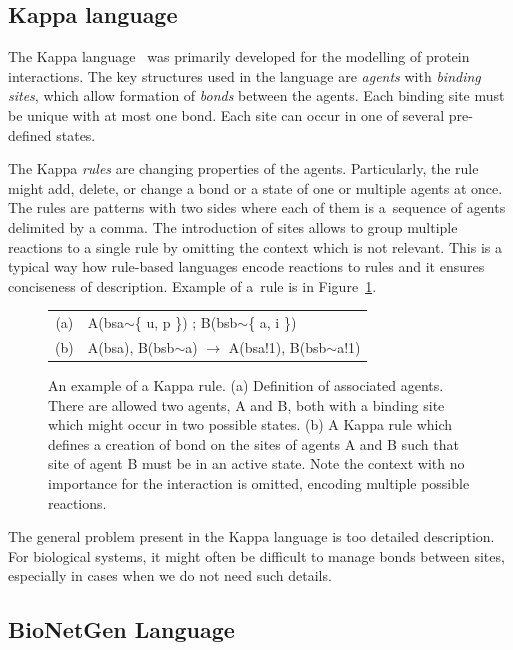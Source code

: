 \documentclass[11pt,a4paper]{report}
\begin{document}
\subsection{Kappa language}
\label{kappa}

The Kappa language~\cite{kappa_formal} was primarily developed for the modelling of protein interactions. The key structures used in the language are \emph{agents} with \emph{binding sites}, which allow formation of \emph{bonds} between the agents. Each binding site must be unique with at most one bond. Each site can occur in one of several pre-defined states.

The Kappa \emph{rules} are changing properties of the agents. Particularly, the rule might add, delete, or change a bond or a state of one or multiple agents at once. The rules are patterns with two sides where each of them is a~sequence of agents delimited by a comma. The introduction of sites allows to group multiple reactions to a single rule by omitting the context which is not relevant. This is a typical way how rule-based languages encode reactions to rules and it ensures conciseness of description. Example of a~rule is in Figure~\ref{kappa-rule}.

\begin{figure}[!h]
\begin{center}
\begin{tabular}{c l}
(a) & A(bsa$\sim$\{ u, p \}) ; B(bsb$\sim$\{ a, i \}) \\
(b) & A(bsa), B(bsb$\sim$a) $\rightarrow$ A(bsa!1), B(bsb$\sim$a!1) \\
\end{tabular}
\end{center}
\caption{An example of a Kappa rule. (a) Definition of associated agents. There are allowed two agents, A and B, both with a binding site which might occur in two possible states. (b) A Kappa rule which defines a creation of bond on the sites of agents A and B such that site of agent B must be in an active state. Note the context with no importance for the interaction is omitted, encoding multiple possible reactions.}\label{kappa-rule}
\end{figure}

The general problem present in the Kappa language is too detailed description. For biological systems, it might often be difficult to manage bonds between sites, especially in cases when we do not need such details.

\subsection{BioNetGen Language}
\label{bngl}
\end{document}
